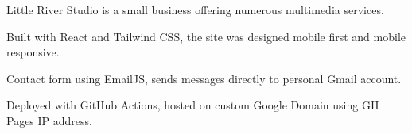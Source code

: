 \documentclass[]{deedy-resume-openfont}
\begin{document}
\begin{minipage}[t]{0.66\textwidth}
\begin{tightemize}
\item Little River Studio is a small business offering numerous multimedia services.
\item Built with React and Tailwind CSS, the site was designed mobile first and mobile responsive.
\item Contact form using EmailJS, sends messages directly to personal Gmail account.
\item Deployed with GitHub Actions, hosted on custom Google Domain using GH Pages IP address. 
\end{tightemize}
\sectionsep


%
%


\end{minipage}%
\hfill
\end{document}
